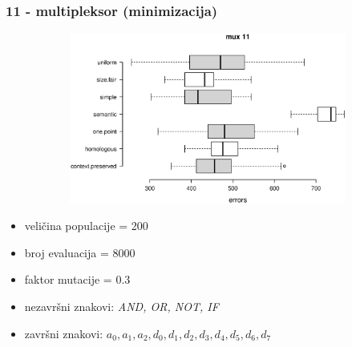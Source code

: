 \documentclass{beamer}
\begin{document}
\begin{frame}
\frametitle{11 - multipleksor (minimizacija)}


\begin{figure}[!htb]
\begin{figure}[H]
	\centering
	\includegraphics[trim=3cm 6cm 0cm 3.5cm, scale=0.3]{./boxPlots/mux11.eps}
\end{figure}
\endminipage
{}
\endminipage
\end{figure}

\begin{itemize}
\item{veličina populacije = 200}
\item{broj evaluacija = 8000}
\item{faktor mutacije = 0.3}
\item{nezavršni znakovi: \textit{AND, OR, NOT, IF}}
\item{završni znakovi: \textit{$a_0, a_1, a_2, d_0, d_1, d_2, d_3, d_4, d_5, d_6, d_7$}}
\end{itemize}
\end{frame}
\end{document}
